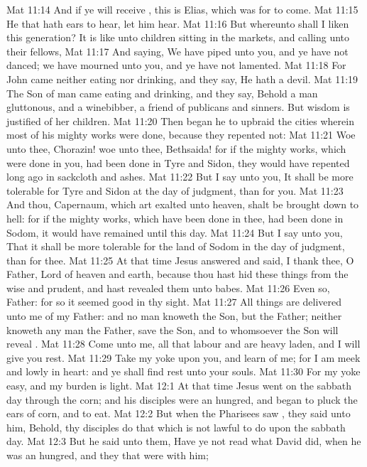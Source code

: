 \vs Mat 11:14 And if ye will receive , this is Elias, which was for to come.
\vs Mat 11:15 He that hath ears to hear, let him hear.
\vs Mat 11:16 But whereunto shall I liken this generation? It is like unto children sitting in the markets, and calling unto their fellows,
\vs Mat 11:17 And saying, We have piped unto you, and ye have not danced; we have mourned unto you, and ye have not lamented.
\vs Mat 11:18 For John came neither eating nor drinking, and they say, He hath a devil.
\vs Mat 11:19 The Son of man came eating and drinking, and they say, Behold a man gluttonous, and a winebibber, a friend of publicans and sinners. But wisdom is justified of her children.
\vs Mat 11:20 Then began he to upbraid the cities wherein most of his mighty works were done, because they repented not:
\vs Mat 11:21 Woe unto thee, Chorazin! woe unto thee, Bethsaida! for if the mighty works, which were done in you, had been done in Tyre and Sidon, they would have repented long ago in sackcloth and ashes.
\vs Mat 11:22 But I say unto you, It shall be more tolerable for Tyre and Sidon at the day of judgment, than for you.
\vs Mat 11:23 And thou, Capernaum, which art exalted unto heaven, shalt be brought down to hell: for if the mighty works, which have been done in thee, had been done in Sodom, it would have remained until this day.
\vs Mat 11:24 But I say unto you, That it shall be more tolerable for the land of Sodom in the day of judgment, than for thee.
\vs Mat 11:25 At that time Jesus answered and said, I thank thee, O Father, Lord of heaven and earth, because thou hast hid these things from the wise and prudent, and hast revealed them unto babes.
\vs Mat 11:26 Even so, Father: for so it seemed good in thy sight.
\vs Mat 11:27 All things are delivered unto me of my Father: and no man knoweth the Son, but the Father; neither knoweth any man the Father, save the Son, and  to whomsoever the Son will reveal .
\vs Mat 11:28 Come unto me, all  that labour and are heavy laden, and I will give you rest.
\vs Mat 11:29 Take my yoke upon you, and learn of me; for I am meek and lowly in heart: and ye shall find rest unto your souls.
\vs Mat 11:30 For my yoke  easy, and my burden is light.
\vs Mat 12:1 At that time Jesus went on the sabbath day through the corn; and his disciples were an hungred, and began to pluck the ears of corn, and to eat.
\vs Mat 12:2 But when the Pharisees saw , they said unto him, Behold, thy disciples do that which is not lawful to do upon the sabbath day.
\vs Mat 12:3 But he said unto them, Have ye not read what David did, when he was an hungred, and they that were with him;
